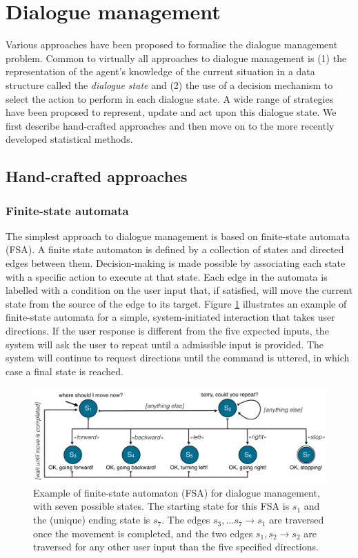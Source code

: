 \section{Dialogue management}
\label{sec:dm}

Various approaches have been proposed to formalise the dialogue management problem.  Common to virtually all approaches to dialogue management is (1) the representation of the agent's knowledge of the current situation in a data structure called the \textit{dialogue state} and (2) the use of a decision mechanism to select the action to perform in each dialogue state. A wide range of strategies have been proposed to represent, update and act upon this dialogue state.  We first describe hand-crafted approaches and then move on to the more recently developed statistical methods. 

\subsection{Hand-crafted approaches}
\label{sec:handcrafted}

\subsubsection*{Finite-state automata}

The simplest approach to dialogue management is based on finite-state automata (FSA).  A finite state automaton is defined by a collection of states and directed edges between them.  Decision-making is made possible by associating each state with a specific action to execute at that state. Each edge in the automata is labelled with a condition on the user input that, if satisfied, will move the current state from the source of the edge to its target.  Figure \ref{fig:fsa} illustrates an example of finite-state automata for a simple, system-initiated interaction that takes user directions.  If the user response is different from the five expected inputs, the system will ask the user to repeat until a admissible input is provided.  The system will continue to request directions until the  command is uttered, in which case a final state is reached. 


\begin{figure}[h]
\centering
\includegraphics[scale=0.32]{imgs/fsa.pdf}
\caption{Example of finite-state automaton (FSA) for dialogue management, with seven possible states. The starting state for this FSA is $s_1$ and the (unique) ending state is $s_7$. The edges $s_3,... s_7 \rightarrow s_1$ are traversed once the movement is completed, and the two edges $s_1, s_2 \rightarrow s_2$ are traversed for any other user input than the five specified directions.}
\label{fig:fsa}
\end{figure}

